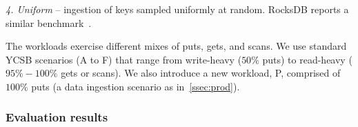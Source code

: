 \emph{4. Uniform} -- ingestion of keys sampled uniformly at random. RocksDB
reports a similar benchmark~\cite{rocksdb-benchmarks}. %

The workloads exercise different mixes of puts, gets, and scans. We use standard YCSB scenarios 
(A to F) that range from write-heavy ($50\%$ puts) to read-heavy ($95\%-100\%$ gets or scans). 
We also introduce a new workload, P, comprised of $100\%$ puts (a data ingestion scenario
as in~\cref{ssec:prod}).


\subsubsection{Evaluation results}

